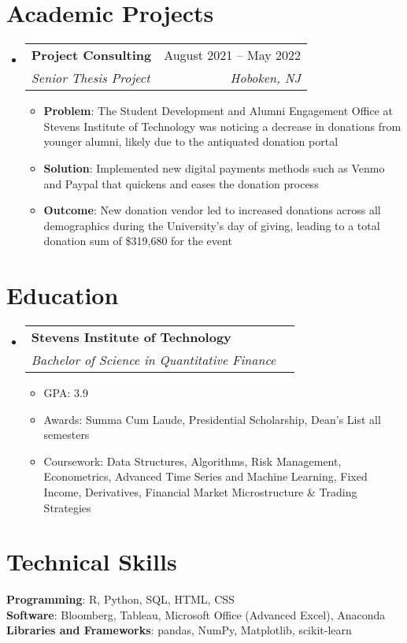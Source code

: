 \documentclass[letterpaper,11pt]{article}
\makeatletter
\newcommand{\resumeItem}[1]{
  \item\small{
    {#1 \vspace{-2pt}}
  }
}
\newcommand{\resumeSubheading}[4]{
  \vspace{-2pt}\item
    \begin{tabular*}{0.97\textwidth}[t]{l@{\extracolsep{\fill}}r}
      \textbf{#1} & #2 \\
      \textit{\small#3} & \textit{\small #4} \\
    \end{tabular*}\vspace{-7pt}
}
\newcommand{\resumeSubHeadingListStart}{\begin{itemize}[leftmargin=0.15in, label={}]}
\newcommand{\resumeSubHeadingListEnd}{\end{itemize}}
\newcommand{\resumeItemListStart}{\begin{itemize}}
\newcommand{\resumeItemListEnd}{\end{itemize}\vspace{-5pt}}
\makeatother
\begin{document}
\section{Academic Projects}
    \resumeSubHeadingListStart
        \resumeSubheading
      {Project Consulting}{August 2021 --  May 2022}
      {Senior Thesis Project}{Hoboken, NJ}
          \resumeItemListStart
            \resumeItem{\textbf{Problem}: The Student Development and Alumni Engagement Office at Stevens Institute of Technology was noticing a decrease in donations from younger alumni, likely due to the antiquated donation portal}
             \resumeItem{\textbf{Solution}: Implemented new digital payments methods such as Venmo and Paypal that quickens and eases the donation process}
            \resumeItem{\textbf{Outcome}: New donation vendor led to increased donations across all demographics during the University's day of giving, leading to a total donation sum of \$319,680 for the event}
          \resumeItemListEnd
    \resumeSubHeadingListEnd

\section{Education}
  \resumeSubHeadingListStart
    \resumeSubheading
      {Stevens Institute of Technology}{}
      {Bachelor of Science in Quantitative Finance}{}
      \resumeItemListStart
        \resumeItem{GPA: 3.9}
        \resumeItem{Awards: Summa Cum Laude, Presidential Scholarship, Dean's List all semesters}
        \resumeItem{Coursework: Data Structures, Algorithms, Risk Management, Econometrics, Advanced Time Series and Machine Learning, Fixed Income, Derivatives, Financial Market Microstructure \& Trading Strategies}
      \resumeItemListEnd
  \resumeSubHeadingListEnd
  
\section{Technical Skills}
 \begin{itemize}[leftmargin=0.15in, label={}]
    \small{\item{
     \textbf{Programming}{: R, Python, SQL, HTML, CSS} \\
     \textbf{Software}{: Bloomberg, Tableau, Microsoft Office (Advanced Excel), Anaconda} \\
     \textbf{Libraries and Frameworks}{: pandas, NumPy, Matplotlib, scikit-learn}
    }}
 \end{itemize}
\end{document}
